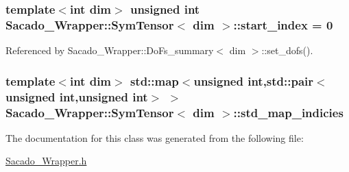 \subsubsection[{\texorpdfstring{start\+\_\+index}{start_index}}]{\setlength{\rightskip}{0pt plus 5cm}template$<$int dim$>$ unsigned int {\bf Sacado\+\_\+\+Wrapper\+::\+Sym\+Tensor}$<$ dim $>$\+::start\+\_\+index = 0}\hypertarget{classSacado__Wrapper_1_1SymTensor_afe921e6044e4110fcfc848c52844d650}{}\label{classSacado__Wrapper_1_1SymTensor_afe921e6044e4110fcfc848c52844d650}


Referenced by Sacado\+\_\+\+Wrapper\+::\+Do\+Fs\+\_\+summary$<$ dim $>$\+::set\+\_\+dofs().

\subsubsection[{\texorpdfstring{std\+\_\+map\+\_\+indicies}{std_map_indicies}}]{\setlength{\rightskip}{0pt plus 5cm}template$<$int dim$>$ std\+::map$<$unsigned int,std\+::pair$<$unsigned int,unsigned int$>$ $>$ {\bf Sacado\+\_\+\+Wrapper\+::\+Sym\+Tensor}$<$ dim $>$\+::std\+\_\+map\+\_\+indicies}\hypertarget{classSacado__Wrapper_1_1SymTensor_ae3b1c56cde3fc5c7805b618ef3d9de75}{}\label{classSacado__Wrapper_1_1SymTensor_ae3b1c56cde3fc5c7805b618ef3d9de75}


The documentation for this class was generated from the following file\+:\begin{DoxyCompactItemize}
\item 
\hyperlink{Sacado__Wrapper_8h}{Sacado\+\_\+\+Wrapper.\+h}\end{DoxyCompactItemize}
